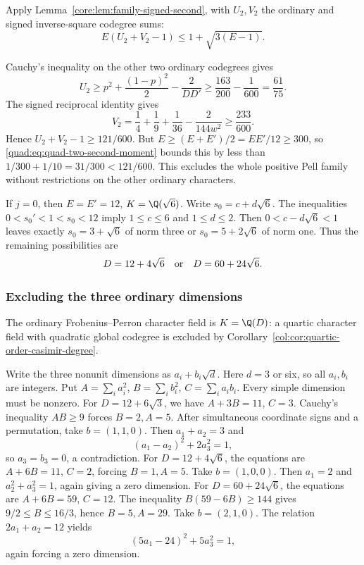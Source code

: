 Apply Lemma~\ref{core:lem:family-signed-second}, with $U_2,V_2$
the ordinary and signed inverse-square codegree sums:
\begin{equation}\label{quad:eq:quad-two-second-moment}
 E(U_2+V_2-1)\le1+\sqrt{3(E-1)}.
\end{equation}

Cauchy's inequality on the other two ordinary codegrees gives
\[
 U_2\ge p^2+\frac{(1-p)^2}{2}-\frac2{DD'}
       \ge\frac{163}{200}-\frac1{600}=\frac{61}{75}.
\]
The signed reciprocal identity gives
\[
 V_2=\frac14+\frac19+\frac1{36}-\frac2{144w^2}
       \ge\frac{233}{600}.
\]
Hence $U_2+V_2-1\ge121/600$.
But $E\ge(E+E')/2=EE'/12\ge300$, so
\eqref{quad:eq:quad-two-second-moment} bounds this by less than
$1/300+1/10=31/300<121/600$. This excludes the whole positive
Pell family without restrictions on the other ordinary characters.

If $j=0$, then $E=E'=12$, $K=\Q(\sqrt6)$.
Write $s_0=c+d\sqrt6$. The inequalities
$0<s_0'<1<s_0<12$ imply $1\le c\le6$ and $1\le d\le2$.
Then $0<c-d\sqrt6<1$ leaves exactly
$s_0=3+\sqrt6$ of norm three or $s_0=5+2\sqrt6$ of norm one.
Thus the remaining possibilities are
\begin{equation}\label{quad:eq:quad-two-residual-six}
 D=12+4\sqrt6\quad\hbox{or}\quad D=60+24\sqrt6.
\end{equation}

\subsubsection{Excluding the three ordinary dimensions}

The ordinary Frobenius--Perron character field is $K=\Q(D)$:
a quartic character field with quadratic global codegree is excluded
by Corollary~\ref{col:cor:quartic-order-casimir-degree}.

Write the three nonunit dimensions as $a_i+b_i\sqrt d$.
Here $d=3$ or six, so all $a_i,b_i$ are integers. Put
$A=\sum_i a_i^2$, $B=\sum_i b_i^2$, $C=\sum_i a_i b_i$.
Every simple dimension must be nonzero.
For $D=12+6\sqrt3$, we have $A+3B=11$, $C=3$.
Cauchy's inequality $AB\ge9$ forces $B=2,A=5$.
After simultaneous coordinate signs and a permutation, take
$b=(1,1,0)$. Then $a_1+a_2=3$ and
\[
 (a_1-a_2)^2+2a_3^2=1,
\]
so $a_3=b_3=0$, a contradiction.
For $D=12+4\sqrt6$, the equations are $A+6B=11$, $C=2$,
forcing $B=1,A=5$. Take $b=(1,0,0)$.
Then $a_1=2$ and $a_2^2+a_3^2=1$, again giving a zero dimension.
For $D=60+24\sqrt6$, the equations are $A+6B=59$, $C=12$.
The inequality $B(59-6B)\ge144$ gives
$9/2\le B\le16/3$, hence $B=5,A=29$.
Take $b=(2,1,0)$. The relation $2a_1+a_2=12$ yields
\[
 (5a_1-24)^2+5a_3^2=1,
\]
again forcing a zero dimension.

